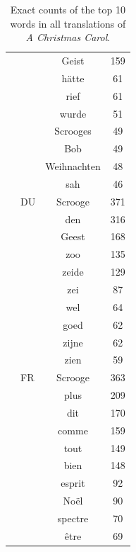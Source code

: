\documentclass[shortpaper]{revdetua}
\begin{document}
\begin{table}[H]
\begin{tabular}{@{}cccc@{}}
        & \multicolumn{1}{l|}{}     & Geist       & 159       \\
        & \multicolumn{1}{l|}{}     & hätte       & 61        \\
        & \multicolumn{1}{l|}{}     & rief        & 61        \\
        & \multicolumn{1}{l|}{}     & wurde       & 51        \\
        & \multicolumn{1}{l|}{}     & Scrooges    & 49        \\
        & \multicolumn{1}{l|}{}     & Bob         & 49        \\
        & \multicolumn{1}{l|}{}     & Weihnachten & 48        \\
        & \multicolumn{1}{l|}{}     & sah         & 46        \\ \cmidrule(l){2-4} 
        & \multicolumn{1}{l|}{DU}   & Scrooge     & 371       \\
        & \multicolumn{1}{l|}{}     & den         & 316       \\
        & \multicolumn{1}{l|}{}     & Geest       & 168       \\
        & \multicolumn{1}{l|}{}     & zoo         & 135       \\
        & \multicolumn{1}{l|}{}     & zeide       & 129       \\
        & \multicolumn{1}{l|}{}     & zei         & 87        \\
        & \multicolumn{1}{l|}{}     & wel         & 64        \\
        & \multicolumn{1}{l|}{}     & goed        & 62        \\
        & \multicolumn{1}{l|}{}     & zijne       & 62        \\
        & \multicolumn{1}{l|}{}     & zien        & 59        \\ \cmidrule(l){2-4} 
        & \multicolumn{1}{l|}{FR}   & Scrooge     & 363       \\
        & \multicolumn{1}{l|}{}     & plus        & 209       \\
        & \multicolumn{1}{l|}{}     & dit         & 170       \\
        & \multicolumn{1}{l|}{}     & comme       & 159       \\
        & \multicolumn{1}{l|}{}     & tout        & 149       \\
        & \multicolumn{1}{l|}{}     & bien        & 148       \\
        & \multicolumn{1}{l|}{}     & esprit      & 92        \\
        & \multicolumn{1}{l|}{}     & Noël        & 90        \\
        & \multicolumn{1}{l|}{}     & spectre     & 70        \\
        & \multicolumn{1}{l|}{}     & être        & 69        \\ \bottomrule
\end{tabular}
\caption{Exact counts of the top 10 words in all translations of \textit{A Christmas Carol}.}
\end{table}
\newpage
\end{document}
